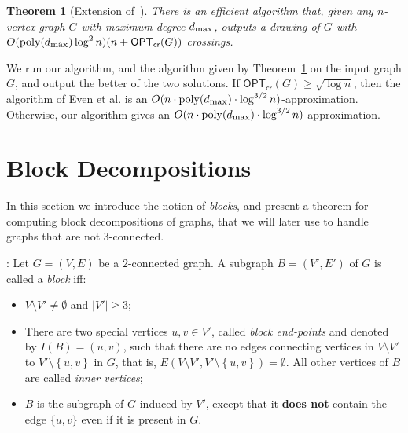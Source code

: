 \documentclass[twoside,leqno,twocolumn]{article}
\newcommand{\set}[1]{\left\{ #1 \right\}}
\newtheorem{theorem}{Theorem}
\newenvironment{Definition}{{\bf Definition}: }{}
\newcommand{\poly}{\operatorname{poly}}
\newcommand{\optcro}[1]{\mathsf{OPT}_{\mathsf{cr}}(#1)}
\newcommand{\dmax}{d_{\mbox{\textup{\footnotesize{max}}}}}
\begin{document}
\begin{theorem}[Extension of~\cite{EvenGS02}]\label{thm: Even: extension}
There is an efficient algorithm that, given any $n$-vertex graph $G$ with maximum degree $\dmax$, outputs a drawing of $G$ with $O(\poly(\dmax)\log^2n)(n+\optcro{G})$ crossings.
\end{theorem}

We run our algorithm, and the algorithm given by Theorem~\ref{thm: Even: extension} on the input graph $G$, and output the better of the two solutions. If $\optcro{G}\geq \sqrt{\log n}$, then the algorithm of Even et al. is an $O(n \cdot\poly(\dmax)\cdot \log^{3/2}n)$-approximation. Otherwise, our algorithm gives an $O(n\cdot \poly(\dmax)\cdot \log^{3/2}n)$-approximation.










\iffull
\newpage
\fi

\appendix
\section{Block Decompositions}\label{sec: blocks}
In this section we introduce the notion of \textit{blocks}, and present a theorem for computing block decompositions of graphs, that we will
later use to handle graphs that are not $3$-connected. 


\begin{Definition}
Let $G=(V,E)$ be a $2$-connected graph. 
A subgraph $B=(V',E')$ of $G$ is called a \emph{block} iff: 

\begin{itemize}
\item $V\setminus V'\neq\emptyset$ and $|V'|\geq 3$;
\item There are two special vertices $u,v\in V'$, called \emph{block end-points} and denoted by $I(B)=(u,v)$, such that there are no edges connecting vertices in $V\setminus V'$ to $V'\setminus\set{u,v}$ in $G$, that is, $E(V\setminus V',V'\setminus\set{u,v})=\emptyset$. All other vertices of $B$ are called \emph{inner vertices}; 

\item  $B$ is the subgraph of $G$ induced by $V'$, except that it {\bf does not} contain the edge $\{u,v\}$ even if it is present in $G$.
\end{itemize}
\end{Definition}
\end{document}
